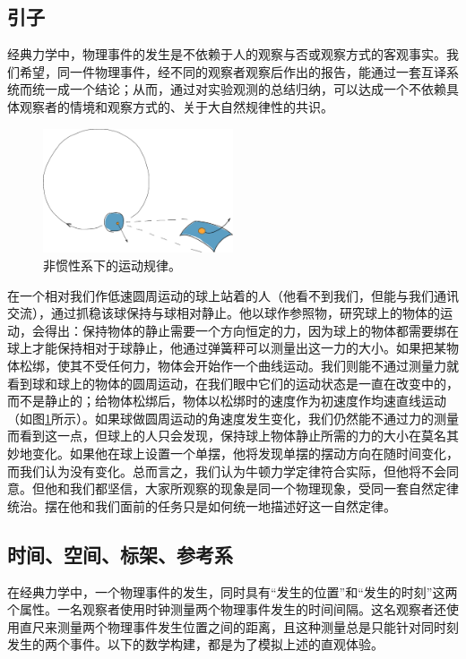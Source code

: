 \documentclass[main.tex]{subfiles}
\begin{document}
\subsection{引子}
经典力学中，物理事件的发生是不依赖于人的观察与否或观察方式的客观事实。我们希望，同一件物理事件，经不同的观察者观察后作出的报告，能通过一套互译系统而统一成一个结论；从而，通过对实验观测的总结归纳，可以达成一个不依赖具体观察者的情境和观察方式的、关于大自然规律性的共识。

\begin{figure}[h]
    \centering
    \includegraphics[width=0.5\textwidth]{images/III.1.1.eps}
    \caption{非惯性系下的运动规律。}
    \label{fig:III.1.1}
\end{figure}

\begin{example}[非惯性系]
在一个相对我们作低速圆周运动的球上站着的人（他看不到我们，但能与我们通讯交流），通过抓稳该球保持与球相对静止。他以球作参照物，研究球上的物体的运动，会得出：保持物体的静止需要一个方向恒定的力，因为球上的物体都需要绑在球上才能保持相对于球静止，他通过弹簧秤可以测量出这一力的大小。如果把某物体松绑，使其不受任何力，物体会开始作一个曲线运动。我们则能不通过测量力就看到球和球上的物体的圆周运动，在我们眼中它们的运动状态是一直在改变中的，而不是静止的；给物体松绑后，物体以松绑时的速度作为初速度作均速直线运动（如图\ref{fig:III.1.1}所示）。如果球做圆周运动的角速度发生变化，我们仍然能不通过力的测量而看到这一点，但球上的人只会发现，保持球上物体静止所需的力的大小在莫名其妙地变化。如果他在球上设置一个单摆，他将发现单摆的摆动方向在随时间变化，而我们认为没有变化。总而言之，我们认为牛顿力学定律符合实际，但他将不会同意。但他和我们都坚信，大家所观察的现象是同一个物理现象，受同一套自然定律统治。摆在他和我们面前的任务只是如何统一地描述好这一自然定律。
\end{example}

\subsection{时间、空间、标架、参考系}
在经典力学中，一个物理事件的发生，同时具有“发生的位置”和“发生的时刻”这两个属性。一名观察者使用时钟测量两个物理事件发生的时间间隔。这名观察者还使用直尺来测量两个物理事件发生位置之间的距离，且这种测量总是只能针对同时刻发生的两个事件。以下的数学构建，都是为了模拟上述的直观体验。
\end{document}
